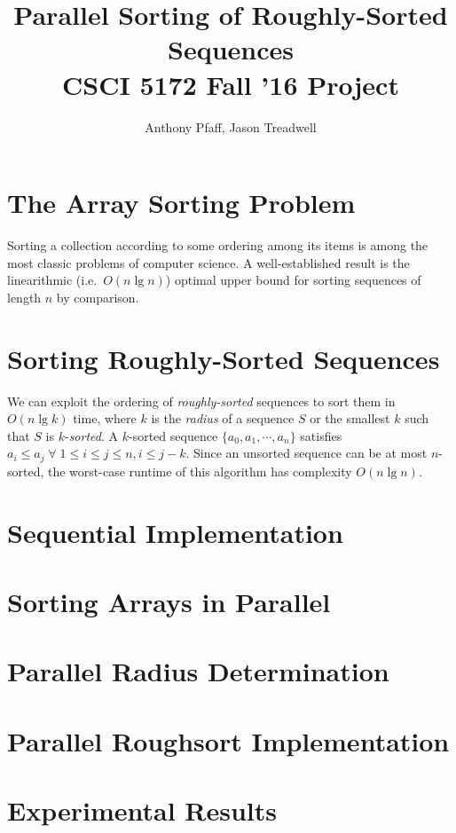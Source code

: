 \documentclass[letterpaper, 12pt]{article}
\title{Parallel Sorting of Roughly-Sorted Sequences\\CSCI 5172 Fall '16 Project}
\author{Anthony Pfaff, Jason Treadwell}
\begin{document}
\maketitle

\section{The Array Sorting Problem}

Sorting a collection according to some ordering among its items is among the most classic problems of computer science.
A well-established result is the linearithmic  (i.e.\ $O(n \lg n)$) optimal upper bound for sorting sequences of length $n$ by
  comparison.

\section{Sorting Roughly-Sorted Sequences}

We can exploit the ordering of \textit{roughly-sorted} sequences to sort them in $O(n \lg k)$ time, where $k$ is the
  \textit{radius} of a sequence $S$ or the smallest $k$ such that $S$ is $k$-\textit{sorted}.\cite{altman89}
A $k$-sorted sequence $\{a_0, a_1, \cdots, a_n\}$ satisfies $a_i \leq a_j \;\forall\; 1 \leq i \leq j \leq n, i \leq j - k$.
Since an unsorted sequence can be at most $n$-sorted, the worst-case runtime of this algorithm has complexity $O(n \lg n)$.

\section{Sequential Implementation}

\section{Sorting Arrays in Parallel}

\section{Parallel Radius Determination}

\section{Parallel Roughsort Implementation}

\section{Experimental Results}
\end{document}
